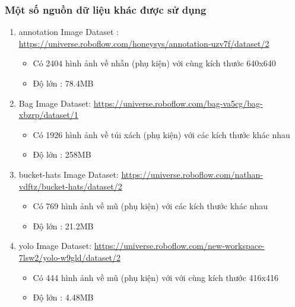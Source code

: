 \subsubsection{Một số nguồn dữ liệu khác được sử dụng}
\begin{enumerate}
    \item annotation Image Dataset : \href{https://universe.roboflow.com/honeysys/annotation-uzv7f/dataset/2}{https://universe.roboflow.com/honeysys/annotation-uzv7f/dataset/2}
    \begin{itemize}
        \item Có 2404 hình ảnh về nhẫn (phụ kiện) với cùng kích thước 640x640
        \item Độ lớn : 78.4MB
    \end{itemize}

    \item Bag Image Dataset: \href{https://universe.roboflow.com/bag-va5cg/bag-xbzrp/dataset/1}{https://universe.roboflow.com/bag-va5cg/bag-xbzrp/dataset/1}
    \begin{itemize}
        \item Có 1926 hình ảnh về túi xách (phụ kiện) với các kích thước khác nhau
        \item Độ lớn : 258MB
        
    \end{itemize}

    \item bucket-hats Image Dataset: \href{https://universe.roboflow.com/nathan-vdftz/bucket-hats/dataset/2}{https://universe.roboflow.com/nathan-vdftz/bucket-hats/dataset/2}
    \begin{itemize}
        \item Có 769 hình ảnh về mũ (phụ kiện) với các kích thước khác nhau
        \item Độ lớn : 21.2MB
      
    \end{itemize}

    \item yolo Image Dataset: \href{https://universe.roboflow.com/new-workspace-7lsw2/yolo-w9gld/dataset/2}{https://universe.roboflow.com/new-workspace-7lsw2/yolo-w9gld/dataset/2}
    \begin{itemize}
        \item Có 444 hình ảnh về mũ (phụ kiện) với với cùng kích thước 416x416
        \item Độ lớn : 4.48MB
      
    \end{itemize}
    
\end{enumerate}


